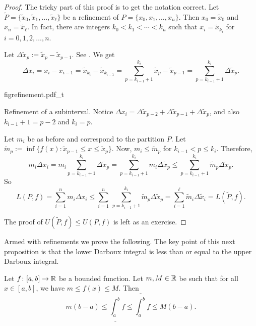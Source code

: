 \begin{proof}
The tricky part of this proof is to get the notation correct.
Let $\widetilde{P} = \{ \widetilde{x}_0, \widetilde{x}_1, \ldots,
\widetilde{x}_{\ell} \}$ be
a refinement of 
$P = \{ x_0, x_1, \ldots, x_n \}$.  Then
$x_0 = \widetilde{x}_0$ and 
$x_n = \widetilde{x}_{\ell}$.  In fact, there are integers
$k_0 < k_1 < \cdots < k_n$ such that $x_i = \widetilde{x}_{k_i}$ for
$i=0,1,2,\ldots,n$.

Let $\Delta \widetilde{x}_p := \widetilde{x}_p - \widetilde{x}_{p-1}$.
See .
We get 
\begin{equation*}
\Delta x_i
=
x_i - x_{i-1} =
\widetilde{x}_{k_i} - \widetilde{x}_{k_{i-1}} =
\sum_{p=k_{i-1}+1}^{k_i} 
\widetilde{x}_{p} - \widetilde{x}_{p-1}
=
\sum_{p=k_{i-1}+1}^{k_i} \Delta \widetilde{x}_p .
\end{equation*}
\begin{myfigureht}
{figrefinement.pdf_t}
\caption{Refinement of a subinterval.  Notice $\Delta x_i =
\Delta \widetilde{x}_{p-2} +
\Delta \widetilde{x}_{p-1} +
\Delta \widetilde{x}_{p}$,
and also
$k_{i-1}+1 = p-2$ and
$k_{i} = p$.\label{fig:refinement}}
\end{myfigureht}

Let $m_i$ be as before and correspond to the partition $P$.
Let $\widetilde{m}_p := \inf \bigl\{ f(x) : \widetilde{x}_{p-1} \leq x \leq
\widetilde{x}_p \bigr\}$.
Now, $m_i \leq \widetilde{m}_p$ for $k_{i-1} < p \leq k_i$.  Therefore,
\begin{equation*}
m_i \Delta x_i
=
m_i \sum_{p=k_{i-1}+1}^{k_i} \Delta \widetilde{x}_p
=
\sum_{p=k_{i-1}+1}^{k_i} m_i \Delta \widetilde{x}_p
\leq
\sum_{p=k_{i-1}+1}^{k_i} \widetilde{m}_p \Delta \widetilde{x}_p .
\end{equation*}
So
\begin{equation*}
L(P,f) =
\sum_{i=1}^n m_i \Delta x_i
\leq
\sum_{i=1}^n \,
\sum_{p=k_{i-1}+1}^{k_i} \widetilde{m}_p \Delta \widetilde{x}_p
=
\sum_{i=1}^{\ell}
\widetilde{m}_i \Delta \widetilde{x}_i = L(\widetilde{P},f).
\end{equation*}

The proof of $U(\widetilde{P},f) \leq U(P,f)$ is left as an exercise.
\end{proof}

Armed with refinements we prove the following.
The key point of this next proposition is that
the lower Darboux integral is less than or equal to the upper Darboux
integral.

\begin{prop} \label{intulbound:prop}
Let $f \colon [a,b] \to {\mathbb{R}}$ be a bounded function.  Let $m, M \in {\mathbb{R}}$ be 
such that for all $x \in [a,b]$, we have $m \leq f(x) \leq M$.  Then
\begin{equation}
\label{intulbound:eq}
m(b-a) \leq
\underline{\int_a^b} f \leq \overline{\int_a^b} f
\leq M(b-a) .
\end{equation}
\end{prop}

